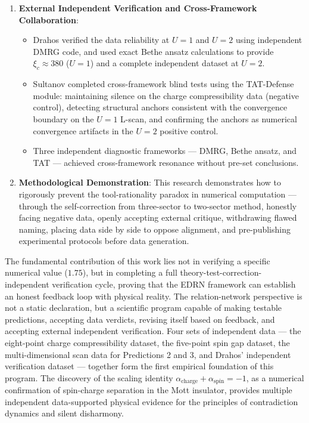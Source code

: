 \documentclass[prb,reprint,twocolumn,superscriptaddress]{revtex4-2}
\begin{document}
\begin{enumerate}
\begin{itemize}
   \end{itemize}
\item \textbf{External Independent Verification and Cross-Framework Collaboration}:
   \begin{itemize}
   \item Drahos verified the data reliability at $U=1$ and $U=2$ using independent DMRG code, and used exact Bethe ansatz calculations to provide $\xi_c \approx 380$ ($U=1$) and a complete independent dataset at $U=2$.
   \item Sultanov completed cross-framework blind tests using the TAT-Defense module: maintaining silence on the charge compressibility data (negative control), detecting structural anchors consistent with the convergence boundary on the $U=1$ L-scan, and confirming the anchors as numerical convergence artifacts in the $U=2$ positive control.
   \item Three independent diagnostic frameworks --- DMRG, Bethe ansatz, and TAT --- achieved cross-framework resonance without pre-set conclusions.
   \end{itemize}
\item \textbf{Methodological Demonstration}: This research demonstrates how to rigorously prevent the tool-rationality paradox in numerical computation --- through the self-correction from three-sector to two-sector method, honestly facing negative data, openly accepting external critique, withdrawing flawed naming, placing data side by side to oppose alignment, and pre-publishing experimental protocols before data generation.
\end{enumerate}

The fundamental contribution of this work lies not in verifying a specific numerical value ($1.75$), but in completing a full theory-test-correction-independent verification cycle, proving that the EDRN framework can establish an honest feedback loop with physical reality. The relation-network perspective is not a static declaration, but a scientific program capable of making testable predictions, accepting data verdicts, revising itself based on feedback, and accepting external independent verification. Four sets of independent data --- the eight-point charge compressibility dataset, the five-point spin gap dataset, the multi-dimensional scan data for Predictions 2 and 3, and Drahos' independent verification dataset --- together form the first empirical foundation of this program. The discovery of the scaling identity $\alpha_{\mathrm{charge}} + \alpha_{\mathrm{spin}} = -1$, as a numerical confirmation of spin-charge separation in the Mott insulator, provides multiple independent data-supported physical evidence for the principles of contradiction dynamics and silent disharmony.
\end{document}
